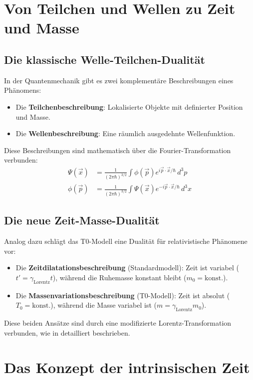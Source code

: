 \documentclass[a4paper,12pt]{article}
\newcommand{\Tzero}{T_0}
\newcommand{\vecx}{\vec{x}}
\newcommand{\gammaf}{\gamma_{\text{Lorentz}}}
\begin{document}
	\section{Von Teilchen und Wellen zu Zeit und Masse}
	
	\subsection{Die klassische Welle-Teilchen-Dualität}
	
	In der Quantenmechanik gibt es zwei komplementäre Beschreibungen eines Phänomens:
	\begin{itemize}
		\item Die \textbf{Teilchenbeschreibung}: Lokalisierte Objekte mit definierter Position und Masse.
		\item Die \textbf{Wellenbeschreibung}: Eine räumlich ausgedehnte Wellenfunktion.
	\end{itemize}
	
	Diese Beschreibungen sind mathematisch über die Fourier-Transformation verbunden:
	\begin{align}
		\Psi(\vecx) &= \frac{1}{(2\pi\hbar)^{3/2}} \int \phi(\vec{p}) e^{i\vec{p}\cdot\vecx/\hbar} \, d^3p \\
		\phi(\vec{p}) &= \frac{1}{(2\pi\hbar)^{3/2}} \int \Psi(\vecx) e^{-i\vec{p}\cdot\vecx/\hbar} \, d^3x
	\end{align}
	
	\subsection{Die neue Zeit-Masse-Dualität}
	
	Analog dazu schlägt das T0-Modell eine Dualität für relativistische Phänomene vor:
	\begin{itemize}
		\item Die \textbf{Zeitdilatationsbeschreibung} (Standardmodell): Zeit ist variabel (\( t' = \gammaf t \)), während die Ruhemasse konstant bleibt (\( m_0 = \text{konst.} \)).
		\item Die \textbf{Massenvariationsbeschreibung} (T0-Modell): Zeit ist absolut (\( \Tzero = \text{konst.} \)), während die Masse variabel ist (\( m = \gammaf m_0 \)).
	\end{itemize}
	
	Diese beiden Ansätze sind durch eine modifizierte Lorentz-Transformation verbunden, wie in \cite{pascher_params_2025} detailliert beschrieben.
	
	\section{Das Konzept der intrinsischen Zeit}
	
\end{document}
